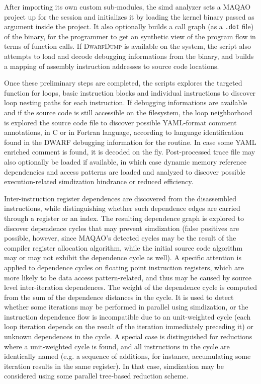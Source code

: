 \documentclass[11pt, a4paper, twoside]{montblanc2}
\def\dd{\textsc{DwarfDump}\xspace}
\begin{document}
After importing its own custom sub-modules, the simd analyzer sets a MAQAO 
project up for the session and initializes it by loading the kernel binary 
passed as argument inside the project. It also optionally builds a call graph 
(as a \verb|.dot| file) of the binary, for the programmer to get an synthetic 
view of the program flow in terms of function calls. If \dd is available on the 
system, the script also attempts to load and decode debugging informations from 
the binary, and builds a mapping of assembly instruction addresses to source 
code locations.

Once these preliminary steps are completed, the scripts explores the targeted 
function for loops, basic instruction blocks and individual instructions to 
discover loop nesting paths for each instruction. If debugging informations are 
available and if the source code is still accessible on the filesystem, the loop 
neighborhood is explored the source code file to discover possible YAML-format 
comment annotations, in C or in Fortran language, according to language 
identification found in the DWARF debugging information for the routine. In case 
some YAML enriched comment is found, it is decoded on the fly. Post-processed 
trace file may also optionally be loaded if available, in which case dynamic 
memory reference dependencies and access patterns are loaded and analyzed to 
discover possible execution-related simdization hindrance or reduced efficiency.

Inter-instruction register dependences are discovered from the disassembled 
instructions, while distinguishing whether such dependence edges are carried 
through a register or an index. The resulting dependence graph is explored to 
discover dependence cycles that may prevent simdization (false positives are 
possible, however, since MAQAO's detected cycles may be the result of the 
compiler register allocation algorithm, while the initial source code algorithm 
may or may not exhibit the dependence cycle as well). A specific attention is 
applied to dependence cycles on floating point instruction registers, which are 
more likely to be data access pattern-related, and thus may be caused by source 
level inter-iteration dependences. The weight of the dependence cycle is 
computed from the sum of the dependence distances in the cycle. It is used to 
detect whether some iterations may be performed in parallel using simdization, 
or the instruction dependence flow is incompatible due to an unit-weighted cycle 
(each loop iteration depends on the result of the iteration immediately 
preceding it) or unknown dependences in the cycle. A special case is 
distinguished for reductions where a unit-weighted cycle is found, and all
instructions in the cycle are identically named (e.g. a sequence of additions, 
for instance, accumulating some iteration results in the same register). In that 
case, simdization may be considered using some parallel tree-based reduction 
scheme.
\end{document}
